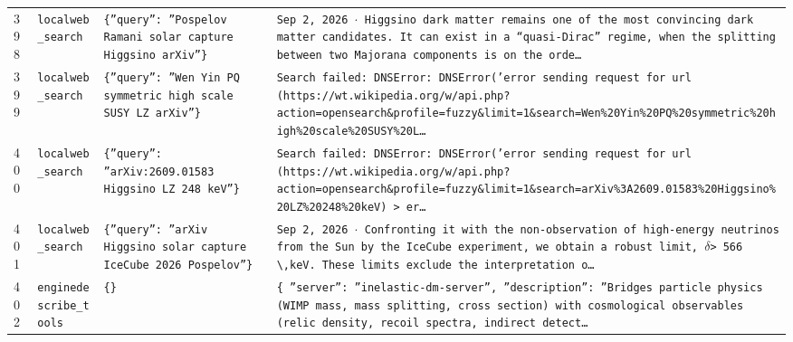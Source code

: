 \documentclass[11pt,a4paper]{article}
\begin{document}
\begin{longtable}{@{}p{}p{}p{}p{}@{}}
398 & \texttt{local}\newline\texttt{web\_\allowbreak{}search} & \texttt{\{''query'':\allowbreak{} ''Pospelov Ramani solar capture Higgsino arXiv''\}\allowbreak{}} & \texttt{Sep 2,\allowbreak{} 2026 $\cdot$ Higgsino dark matter remains one of the most convincing dark matter candidates. It can exist in a ``quasi-Dirac'' regime,\allowbreak{} when the splitting between two Majorana components is on the orde\ldots{}\allowbreak{}} \\
399 & \texttt{local}\newline\texttt{web\_\allowbreak{}search} & \texttt{\{''query'':\allowbreak{} ''Wen Yin PQ symmetric high scale SUSY LZ arXiv''\}\allowbreak{}} & \texttt{Search failed:\allowbreak{} DNSError:\allowbreak{} DNSError('error sending request for url (https:\allowbreak{}/\allowbreak{}/\allowbreak{}wt.wikipedia.org/\allowbreak{}w/\allowbreak{}api.php?action=\allowbreak{}opensearch\&profile=\allowbreak{}fuzzy\&limit=\allowbreak{}1\&search=\allowbreak{}Wen\%20Yin\%20PQ\%20symmetric\%20high\%20scale\%20SUSY\%20L\ldots{}\allowbreak{}} \\
400 & \texttt{local}\newline\texttt{web\_\allowbreak{}search} & \texttt{\{''query'':\allowbreak{} ''arXiv:\allowbreak{}2609.01583 Higgsino LZ 248 keV''\}\allowbreak{}} & \texttt{Search failed:\allowbreak{} DNSError:\allowbreak{} DNSError('error sending request for url (https:\allowbreak{}/\allowbreak{}/\allowbreak{}wt.wikipedia.org/\allowbreak{}w/\allowbreak{}api.php?action=\allowbreak{}opensearch\&profile=\allowbreak{}fuzzy\&limit=\allowbreak{}1\&search=\allowbreak{}arXiv\%3A2609.01583\%20Higgsino\%20LZ\%20248\%20keV)\allowbreak{} \textgreater{}\allowbreak{} er\ldots{}\allowbreak{}} \\
401 & \texttt{local}\newline\texttt{web\_\allowbreak{}search} & \texttt{\{''query'':\allowbreak{} ''arXiv Higgsino solar capture IceCube 2026 Pospelov''\}\allowbreak{}} & \texttt{Sep 2,\allowbreak{} 2026 $\cdot$ Confronting it with the non-observation of high-energy neutrinos from the Sun by the IceCube experiment,\allowbreak{} we obtain a robust limit,\allowbreak{} $\delta$\textgreater{}\allowbreak{} 566 \textbackslash{}\allowbreak{},\allowbreak{}keV. These limits exclude the interpretation o\ldots{}\allowbreak{}} \\
402 & \texttt{engine}\newline\texttt{describe\_\allowbreak{}tools} & \texttt{\{\}\allowbreak{}} & \texttt{\{   ''server'':\allowbreak{} ''inelastic-dm-server'',\allowbreak{}   ''description'':\allowbreak{} ''Bridges particle physics (WIMP mass,\allowbreak{} mass splitting,\allowbreak{} cross section)\allowbreak{} with cosmological observables (relic density,\allowbreak{} recoil spectra,\allowbreak{} indirect detect\ldots{}\allowbreak{}} \\

\end{longtable}
\end{document}

